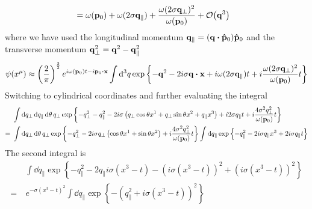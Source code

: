 \begin{example}
\begin{equation*}
\begin{split}
			\\
			&=
			\omega(\vb{p}_0)
			+
			\omega(2\sigma\vb{q}_\parallel)
			+
			\frac{\omega(2\sigma\vb{q}_\perp)^2}{\omega(\vb{p}_0)}
			+
			\order{\vb{q}^3}
		\end{split}
	\end{equation*}
	where we have used the longitudinal momentum $\vb{q}_\parallel=(\vb{q}\vdot\vu{p}_0)\vu{p}_0$ and the transverse momentum $\vb{q}_\perp^2=\vb{q}^2-\vb{q}_\parallel^2$
	\begin{equation*}
		\psi(x^\mu)
		\approx
		\left(\frac{2}{\pi}\right)^\frac{3}{2}
		e^{i\omega(\vb{p}_0)t-i\vb{p}_0\vdot\vb{x}}
		\int\dd[3]{q}
		\exp\left\{
			-
			\vb{q}^2
			-
			2i\sigma
			\vb{q}
			\vdot
			\vb{x}
			+
			i\omega(2\sigma\vb{q}_\parallel)t
			+
			i\frac{\omega(2\sigma\vb{q}_\perp)^2}{\omega(\vb{p}_0)}t
		\right\}
	\end{equation*}
	Switching to cylindrical coordinates and further evaluating the integral
	\begin{equation*}
		\begin{split}
			&\
			\int\dd{q_\perp}\dd{q_\parallel}\dd{\theta} q_\perp
			\exp\left\{
				-
				q_\perp^2
				-
				q_\parallel^2
				-
				2i\sigma
				\left(
					q_\perp
					\cos\theta
					x^1
					+
					q_\perp
					\sin\theta
					x^2
					+
					q_\parallel
					x^3
				\right)
				+
				i2\sigma q_\parallel t
				+
				i\frac{4\sigma^2 q_\perp^2}{\omega(\vb{p}_0)}t
			\right\}
			\\
			=&\
			\int\dd{q_\perp}\dd{\theta} q_\perp
			\exp\left\{
				-
				q_\perp^2
				-
				2i\sigma
				q_\perp
				\left(
					\cos\theta
					x^1
					+
					\sin\theta
					x^2
				\right)
				+
				i\frac{4\sigma^2 q_\perp^2}{\omega(\vb{p}_0)}t
			\right\}
			\int\dd{q_\parallel}
			\exp\left\{
				-
				q_\parallel^2
				-
				2i\sigma
				q_\parallel x^3
				+
				2i\sigma q_\parallel t
			\right\}
		\end{split}		
	\end{equation*}
	The second integral is
	\begin{equation*}
		\begin{split}
			&\
			\int\dd{q_\parallel}
			\exp\left\{
				-
				q_\parallel^2
				-
				2q_\parallel i\sigma (x^3-t)
				-
				\left(i\sigma (x^3-t)\right)^2
				+
				\left(i\sigma (x^3-t)\right)^2
			\right\}
			\\
			=&\
			e^{-\sigma(x^3-t)^2}
			\int\dd{q_\parallel}
			\exp\left\{
				-
				\left(
					q_\parallel^2
					+
					i\sigma (x^3-t)
				\right)^2
			\right\}

\end{split}
\end{equation*}
\end{example}
